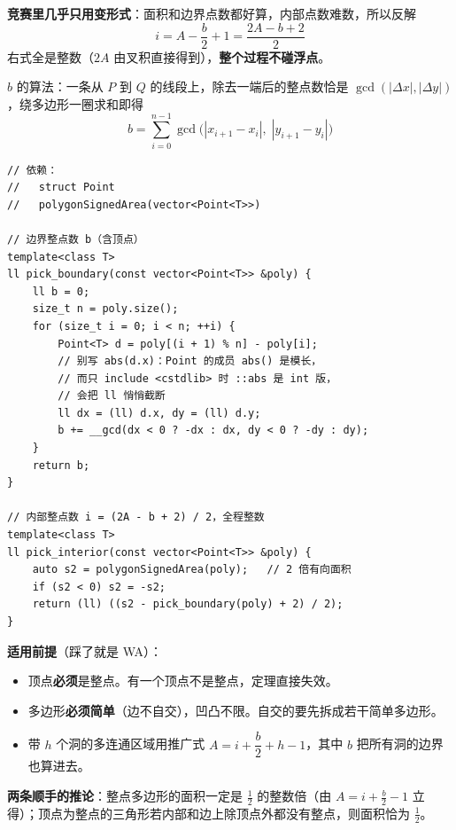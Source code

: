	\textbf{竞赛里几乎只用变形式}：面积和边界点数都好算，内部点数难数，所以反解
	$$
		i = A - \frac{b}{2} + 1 = \frac{2A - b + 2}{2}
	$$
	右式全是整数（$2A$ 由叉积直接得到），\textbf{整个过程不碰浮点}。

	$b$ 的算法：一条从 $P$ 到 $Q$ 的线段上，除去一端后的整点数恰是 $\gcd(|\Delta x|, |\Delta y|)$，绕多边形一圈求和即得
	$$
		b = \sum_{i=0}^{n-1} \gcd\bigl(|x_{i+1} - x_i|,\; |y_{i+1} - y_i|\bigr)
	$$

	\begin{verbatim}
// 依赖：
//   struct Point
//   polygonSignedArea(vector<Point<T>>)

// 边界整点数 b（含顶点）
template<class T>
ll pick_boundary(const vector<Point<T>> &poly) {
	ll b = 0;
	size_t n = poly.size();
	for (size_t i = 0; i < n; ++i) {
		Point<T> d = poly[(i + 1) % n] - poly[i];
		// 别写 abs(d.x)：Point 的成员 abs() 是模长，
		// 而只 include <cstdlib> 时 ::abs 是 int 版，
		// 会把 ll 悄悄截断
		ll dx = (ll) d.x, dy = (ll) d.y;
		b += __gcd(dx < 0 ? -dx : dx, dy < 0 ? -dy : dy);
	}
	return b;
}

// 内部整点数 i = (2A - b + 2) / 2，全程整数
template<class T>
ll pick_interior(const vector<Point<T>> &poly) {
	auto s2 = polygonSignedArea(poly);   // 2 倍有向面积
	if (s2 < 0) s2 = -s2;
	return (ll) ((s2 - pick_boundary(poly) + 2) / 2);
}
	\end{verbatim}

	\textbf{适用前提}（踩了就是 WA）：

	\begin{itemize}
		\item 顶点\textbf{必须}是整点。有一个顶点不是整点，定理直接失效。
		\item 多边形\textbf{必须简单}（边不自交），凹凸不限。自交的要先拆成若干简单多边形。
		\item 带 $h$ 个洞的多连通区域用推广式 $A = i + \dfrac{b}{2} + h - 1$，其中 $b$ 把所有洞的边界也算进去。
	\end{itemize}

	\textbf{两条顺手的推论}：整点多边形的面积一定是 $\tfrac{1}{2}$ 的整数倍（由 $A = i + \tfrac{b}{2} - 1$ 立得）；顶点为整点的三角形若内部和边上除顶点外都没有整点，则面积恰为 $\tfrac{1}{2}$。

	\newpage
